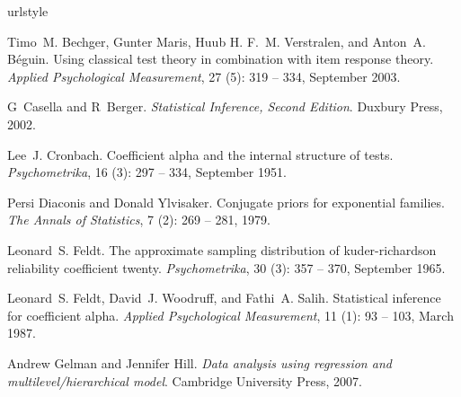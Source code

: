 \documentclass[12pt,epsfig]{article}
\begin{document}

%

\clearpage

%
%
\begin{thebibliography}{28}
\providecommand{\natexlab}[1]{#1}
\providecommand{\url}[1]{\texttt{#1}}
\expandafter\ifx\csname urlstyle\endcsname\relax
  \providecommand{\doi}[1]{doi: #1}\else
  \providecommand{\doi}{doi: \begingroup \urlstyle{rm}\Url}\fi

Timo~M. Bechger, Gunter Maris, Huub H. F.~M. Verstralen, and Anton~A. B\'eguin.
\newblock Using classical test theory in combination with item response theory.
\newblock \emph{Applied Psychological Measurement}, 27 (5):
  319 -- 334, September 2003.

G~Casella and R~Berger.
\newblock \emph{Statistical Inference, Second Edition}.
\newblock Duxbury Press, 2002.

Lee~J. Cronbach.
\newblock Coefficient alpha and the internal structure of tests.
\newblock \emph{Psychometrika}, 16 (3): 297 -- 334, September
  1951.

Persi Diaconis and Donald Ylvisaker.
\newblock Conjugate priors for exponential families.
\newblock \emph{The Annals of Statistics}, 7 (2): 269 -- 281,
  1979.

Leonard~S. Feldt.
\newblock The approximate sampling distribution of kuder-richardson reliability
  coefficient twenty.
\newblock \emph{Psychometrika}, 30 (3): 357 -- 370, September
  1965.

Leonard~S. Feldt, David~J. Woodruff, and Fathi~A. Salih.
\newblock Statistical inference for coefficient alpha.
\newblock \emph{Applied Psychological Measurement}, 11 (1):
  93 -- 103, March 1987.

Andrew Gelman and Jennifer Hill.
\newblock \emph{Data analysis using regression and multilevel/hierarchical
  model}.
\newblock Cambridge University Press, 2007.


\end{thebibliography}
\end{document}
